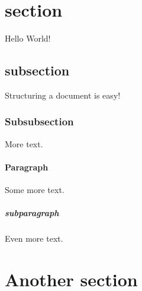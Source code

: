 \documentclass{article}
\begin{document}
	\section{section}
		Hello World!
		\subsection{subsection}
		Structuring a document is easy!
		\subsubsection{Subsubsection}
		More text.
		\paragraph{Paragraph}
		Some more text.
		\subparagraph{subparagraph}
	     Even more text.
	     \section{Another section}
\end{document}
